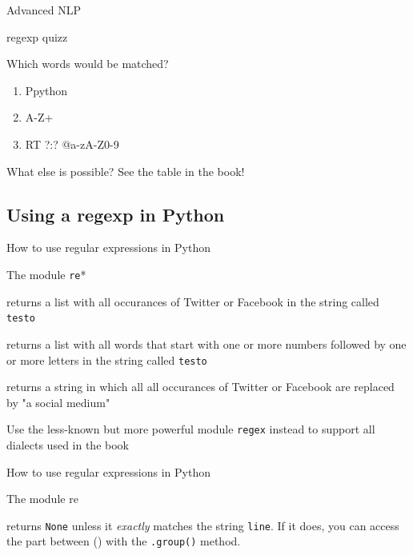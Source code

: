 \documentclass[handout]{beamer}
\begin{document}
\begin{section}{Advanced NLP}
\begin{frame}{regexp quizz}
\begin{block}{Which words would be matched?}
\tt
\begin{enumerate}
\item<1-> \lbrack Pp\rbrack ython
\item<2-> \lbrack A-Z\rbrack +
\item<3-> RT ?:? @\lbrack a-zA-Z0-9\rbrack *
\end{enumerate}
\end{block}
\end{frame}

\begin{frame}{What else is possible?}
See the table in the book!
\end{frame}

\subsection{Using a regexp in Python}
\begin{frame}{How to use regular expressions in Python}
\begin{block}{The module \texttt{re}*}
\begin{description}
\item<1->[{\tt{re.findall("\lbrack Tt\rbrack witter|\lbrack Ff\rbrack acebook",testo)}}] returns a list with all occurances of Twitter or Facebook in the string called {\tt{testo}}
\item<1->[{\tt{re.findall("\lbrack 0-9\rbrack +\lbrack a-zA-Z\rbrack +",testo)}}] returns a list with all words that start with one or more numbers followed by one or more letters in the string called {\tt{testo}}
\item<2->[{\tt{re.sub("\lbrack Tt\rbrack witter|\lbrack Ff\rbrack acebook","a social medium",testo)}}] returns a string in which all all occurances of Twitter or Facebook are replaced by "a social medium"
\end{description}
\end{block}

\tiny{Use the less-known but more powerful module \texttt{regex} instead to support all dialects used in the book}
\end{frame}


\begin{frame}[fragile]{How to use regular expressions in Python}
\begin{block}{The module re}
\begin{description}
\item<1->[{\tt{re.match(" +(\lbrack 0-9\rbrack +) of (\lbrack 0-9\rbrack +) points",line)}}] returns  \texttt{None} unless it \emph{exactly} matches the string \texttt{line}. If it does, you can access the part between () with the \texttt{.group()} method.
\end{description}
\end{block}


\end{frame}
\end{section}
\end{document}
